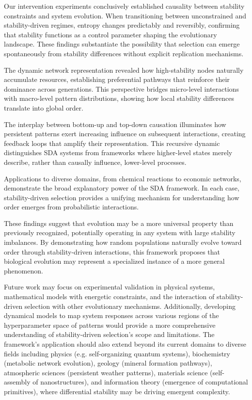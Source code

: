 \documentclass[preprint,12pt]{elsarticle}
\begin{document}
Our intervention experiments conclusively established causality between stability constraints and system evolution. When transitioning between unconstrained and stability-driven regimes, entropy changes predictably and reversibly, confirming that stability functions as a control parameter shaping the evolutionary landscape. These findings substantiate the possibility that selection can emerge spontaneously from stability differences without explicit replication mechanisms.

The dynamic network representation revealed how high-stability nodes naturally accumulate resources, establishing preferential pathways that reinforce their dominance across generations. This perspective bridges micro-level interactions with macro-level pattern distributions, showing how local stability differences translate into global order.

The interplay between bottom-up and top-down causation illuminates how persistent patterns exert increasing influence on subsequent interactions, creating feedback loops that amplify their representation. This recursive dynamic distinguishes SDA systems from frameworks where higher-level states merely describe, rather than causally influence, lower-level processes.

Applications to diverse domains, from chemical reactions to economic networks, demonstrate the broad explanatory power of the SDA framework. In each case, stability-driven selection provides a unifying mechanism for understanding how order emerges from probabilistic interactions.

These findings suggest that evolution may be a more universal property than previously recognized, potentially operating in any system with large stability imbalances. By demonstrating how random populations naturally evolve toward order through stability-driven interactions, this framework proposes that biological evolution may represent a specialized instance of a more general phenomenon.

Future work may focus on experimental validation in physical systems, mathematical models with energetic constraints, and the interaction of stability-driven selection with other evolutionary mechanisms. Additionally, developing dynamical models to map system responses across various regions of the hyperparameter space of patterns would provide a more comprehensive understanding of stability-driven selection's scope and limitations. The framework's application should also extend beyond its current domains to diverse fields including physics (e.g. self-organizing quantum systems), biochemistry (metabolic network evolution), geology (mineral formation pathways), atmospheric sciences (persistent weather patterns), materials science (self-assembly of nanostructures), and information theory (emergence of computational primitives), where differential stability may be driving emergent complexity.
\end{document}
